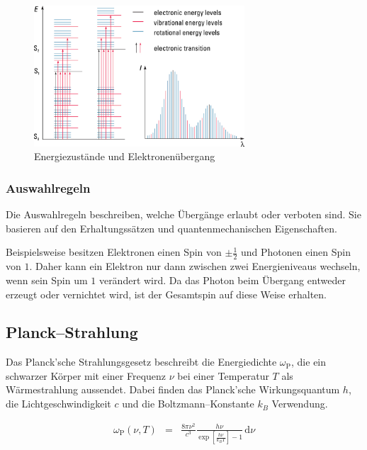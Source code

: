 \documentclass[12pt,a4paper]{scrartcl}
\numberwithin{equation}{section} %
\begin{document}
\begin{figure}[h!]
	\centering
	\includegraphics[width=0.7\textwidth]{../media/B1.1/Uebergaenge.jpg}
	\caption{Energiezustände und Elektronenübergang \cite{Agilent Technologies}}
	\label{abb:Übergänge}
\end{figure}

\subsubsection{Auswahlregeln}
Die Auswahlregeln beschreiben, welche Übergänge erlaubt oder verboten sind. Sie basieren auf den Erhaltungssätzen und quantenmechanischen Eigenschaften.

Beispielsweise besitzen Elektronen einen Spin von $\pm\frac{1}{2}$ und Photonen einen Spin von $1$. Daher kann ein Elektron nur dann zwischen zwei Energieniveaus wechseln, wenn sein Spin um $1$ verändert wird. Da das Photon beim Übergang entweder erzeugt oder vernichtet wird, ist der Gesamtspin auf diese Weise erhalten.

\hypertarget{planckstrahlung}{%
\subsection{Planck--Strahlung}\label{planckstrahlung}}

Das Planck'sche Strahlungsgesetz beschreibt die Energiedichte $\omega_\mathrm{P}$, die ein schwarzer Körper mit einer Frequenz $\nu$ bei einer Temperatur $T$ als Wärmestrahlung aussendet. Dabei finden das Planck'sche Wirkungsquantum $h$, die Lichtgeschwindigkeit $c$ und die Boltzmann--Konstante $k_B$ Verwendung. \cite{Demtröder}

\begin{eqnarray}
    \omega_\mathrm{P}(\nu,T) &=&
        \frac{8\pi\nu^2}{c^3}
        \frac{h\nu}{\exp\left[\frac{h\nu}{k_BT}\right]-1}
        \,\mathrm d\nu
        \label{eq:PlackStrahlung}
\end{eqnarray}
\end{document}
